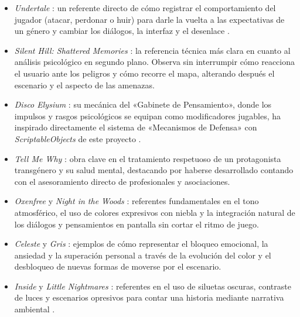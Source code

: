 \begin{itemize}
  \item \textit{Undertale} \parencite{fox2015}: un referente directo de cómo registrar el comportamiento del jugador (atacar, perdonar o huir) para darle la vuelta a las expectativas de un género y cambiar los diálogos, la interfaz y el desenlace \parencite{gomez2026}.
  \item \textit{Silent Hill: Shattered Memories} \parencite{climax2009}: la referencia técnica más clara en cuanto al análisis psicológico en segundo plano. Observa sin interrumpir cómo reacciona el usuario ante los peligros y cómo recorre el mapa, alterando después el escenario y el aspecto de las amenazas.
  \item \textit{Disco Elysium} \parencite{zaum2020}: su mecánica del «Gabinete de Pensamiento», donde los impulsos y rasgos psicológicos se equipan como modificadores jugables, ha inspirado directamente el sistema de «Mecanismos de Defensa» con \textit{ScriptableObjects} de este proyecto \parencite{gomez2026}.
  \item \textit{Tell Me Why} \parencite{dontnod2020}: obra clave en el tratamiento respetuoso de un protagonista transgénero y su salud mental, destacando por haberse desarrollado contando con el asesoramiento directo de profesionales y asociaciones.
  \item \textit{Oxenfree} \parencite{nightschool2016} y \textit{Night in the Woods} \parencite{infinitefall2017}: referentes fundamentales en el tono atmosférico, el uso de colores expresivos con niebla y la integración natural de los diálogos y pensamientos en pantalla sin cortar el ritmo de juego.
  \item \textit{Celeste} \parencite{maddy2018} y \textit{Gris} \parencite{nomada2018}: ejemplos de cómo representar el bloqueo emocional, la ansiedad y la superación personal a través de la evolución del color y el desbloqueo de nuevas formas de moverse por el escenario.
  \item \textit{Inside} \parencite{playdead2016} y \textit{Little Nightmares} \parencite{tarsier2017}: referentes en el uso de siluetas oscuras, contraste de luces y escenarios opresivos para contar una historia mediante narrativa ambiental \parencite{boyero2025}.
\end{itemize}